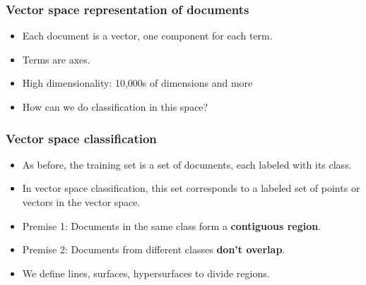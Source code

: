 \documentclass[compress]{beamer}
\newcommand{\1}{\mathbf{1}}
\begin{document}
\begin{frame}
\frametitle{Vector space representation of documents}
\begin{itemize}
\item Each document is a vector, one component for each term.
\item Terms are axes.
\item High dimensionality: 10,000s of dimensions and more
\item How can we do classification in this space?
\end{itemize}
\end{frame}

\begin{frame}
\frametitle{Vector space classification}
\begin{itemize}
\item As before, the training set is a set of documents,
  each labeled with its class.
\item In vector space classification, this set corresponds
  to a labeled set of points or vectors in the vector
  space.
\item Premise 1: Documents in the same class form a
  {\bf contiguous region}.
\item Premise 2: Documents from different classes {\bf don't overlap}.
\item We define lines, surfaces, hypersurfaces to divide regions.
\end{itemize}
\end{frame}
\end{document}
